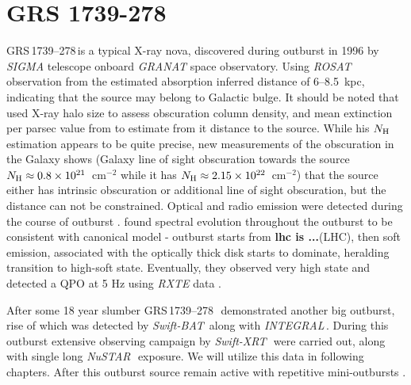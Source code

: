 \documentclass[a4paper,fleqn,usenatbib]{mnras}
\def\grs{{GRS\,1739--278\,}}
\def\swiftx{{\em Swift-XRT\,}}
\def\swiftb{{\em Swift-BAT\,}}
\def\nustar{{\em NuSTAR\,}}
\def\integral{{\em INTEGRAL\,}}
\begin{document}
\section{GRS 1739-278}

\grs is a typical X-ray nova, discovered during outburst in 1996  \citep{paul96} by {\it SIGMA} \citep{paul91} telescope onboard {\it GRANAT} space observatory.
Using {\it ROSAT} observation from the estimated absorption \citet{greiner96} inferred distance of 6--8.5~kpc, indicating that the source may belong to Galactic bulge. 
It should be noted that \citet{greiner96} used X-ray halo size to assess obscuration column density, and mean extinction per parsec value from \citep{1973asqu.book.....A} to estimate from it distance to the source. 
While his $N_{\rm H}$ estimation appears to be quite precise, new measurements of the obscuration in the Galaxy \citep{1990ARA&A..28..215D, 2005A&A...440..775K, 2006A&A...453..635M, 2014A&A...566A.120S} shows (Galaxy line of sight obscuration towards the source $N_{\rm H}\approx0.8\times10^{21}$~cm$^{-2}$ while it has $N_{\rm H}\approx2.15\times10^{22}$~cm$^{-2}$) that the source either has intrinsic obscuration or additional line of sight obscuration, but the distance can not be constrained.
Optical and radio emission were detected during the course of outburst \citep{hjellming96,marti97}. 
\citet{borozdin98} found spectral evolution throughout the outburst to be consistent with canonical model - outburst starts from {\bf lhc is ...}(LHC), then soft emission, associated with the optically thick disk starts to dominate, heralding transition to high-soft state. 
Eventually, they observed very high state and detected a QPO at 5 Hz using {\it RXTE} data \citep{borozdin00}.

After some 18 year slumber \grs\ demonstrated another big outburst, rise of which was detected by \swiftb \citep{krimm14_atel} along with \integral \citep{filippova14}. 
During this outburst extensive observing campaign by \swiftx\, were carried out, along with single long \nustar\, exposure. 
We will utilize this data in following chapters. 
After this outburst source remain active with repetitive mini-outbursts \citep{mereminskiy16,yan17}.
\end{document}
